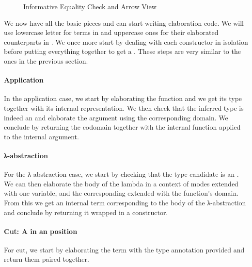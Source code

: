 \begin{figure}[h]
\begin{minipage}[t]{0.45\textwidth}
\end{minipage}
\begin{minipage}[t]{0.45\textwidth}
\end{minipage}
\caption{Informative Equality Check and Arrow View\label{fig:informativecheck}}
\end{figure}

We now have all the basic pieces and can start writing elaboration code. We
will use lowercase letter for terms in  and uppercase ones for their
elaborated counterparts in . We once more start by dealing with each
constructor in isolation before putting everything together to get a
. These steps are very similar to the ones in the previous
section.

\paragraph{Application} In the application case, we start by elaborating the
function and we get its type together with its internal representation. We then
check that the inferred type is indeed an  and elaborate the argument
using the corresponding domain. We conclude by returning the codomain together
with the internal function applied to the internal argument.
\begin{agdasnippet}
\end{agdasnippet}
\paragraph{λ-abstraction} For the λ-abstraction case, we start by
checking that the type candidate  is an . We can
then elaborate the body  of the lambda in a context of modes extended
with one  variable, and the corresponding  extended
with the function's domain. From this we get
an internal term  corresponding to the body of the λ-abstraction and
conclude by returning it wrapped in a  constructor.
\begin{agdasnippet}
\end{agdasnippet}
\paragraph{Cut: A  in an  position} For cut, we start by
elaborating the term with the type annotation provided and return them paired
together.
\begin{agdasnippet}
\end{agdasnippet}
